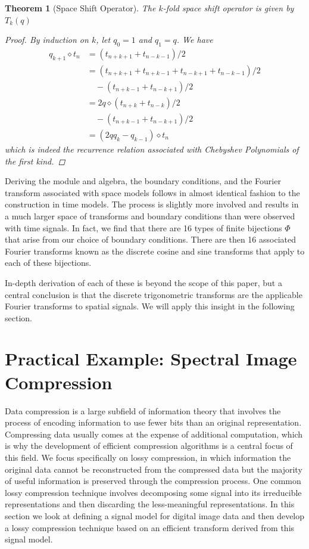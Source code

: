 \documentclass[12pt,technote]{IEEEtran}
\newtheorem{theorem}{Theorem}[section]
\begin{document}
\begin{theorem}[Space Shift Operator]
    The $k$-fold space shift operator is given by $T_k(q)$
    \begin{proof}
        By induction on $k$, let $q_0 = 1$ and $q_1 = q$. We have
        \begin{align*}
            q_{k+1}\diamond t_n &= (t_{n+k+1} + t_{n-k-1})/2\\
            &= (t_{n+k+1} + t_{n+k-1} + t_{n-k+1} + t_{n-k-1})/2\\
            &\quad- (t_{n+k-1} + t_{n-k+1})/2\\
            &= 2q\diamond(t_{n+k} + t_{n-k})/2\\
            &\quad- (t_{n+k-1} + t_{n-k+1})/2\\
            &= (2qq_k - q_{k-1})\diamond t_n
        \end{align*}
        which is indeed the recurrence relation associated with Chebyshev Polynomials of the first kind.
    \end{proof}
\end{theorem}
Deriving the module and algebra, the boundary conditions, and the Fourier transform associated with space models follows in almost identical fashion to the construction in time models. The process is slightly more involved and results in a much larger space of transforms and boundary conditions than were observed with time signals. In fact, we find that there are 16 types of finite bijections $\Phi$ that arise from our choice of boundary conditions. There are then 16 associated Fourier transforms known as the discrete cosine and sine transforms that apply to each of these bijections\cite{AlgebraicSignalProcessing2006}.

In-depth derivation of each of these is beyond the scope of this paper, but a central conclusion is that the discrete trigonometric transforms are the applicable Fourier transforms to spatial signals. We will apply this insight in the following section.
\section{Practical Example: Spectral Image Compression}
Data compression is a large subfield of information theory that involves the process of encoding information to use fewer bits than an original representation. Compressing data usually comes at the expense of additional computation, which is why the development of efficient compression algorithms is a central focus of this field. We focus specifically on lossy compression, in which information the original data cannot be reconstructed from the compressed data but the majority of useful information is preserved through the compression process. One common lossy compression technique involves decomposing some signal into its irreducible representations and then discarding the less-meaningful representations. In this section we look at defining a signal model for digital image data and then develop a lossy compression technique based on an efficient transform derived from this signal model.
\end{document}
